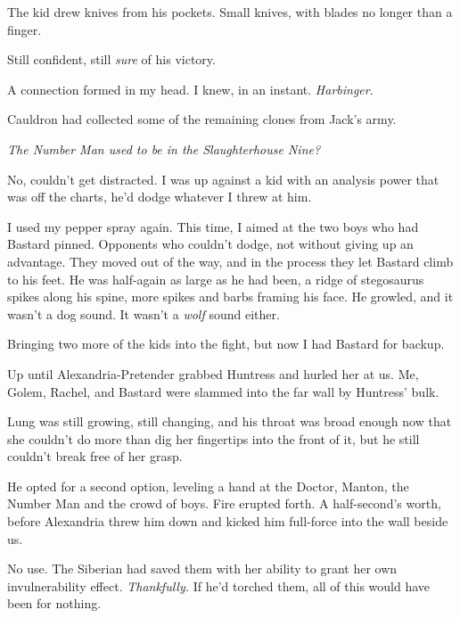 The kid drew knives from his pockets.  Small knives, with blades no longer than a finger.



Still confident, still \emph{sure} of his victory.



A connection formed in my head.  I knew, in an instant.  \emph{Harbinger}.



Cauldron had collected some of the remaining clones from Jack's army.



\emph{The Number Man used to be in the Slaughterhouse Nine?}



No, couldn't get distracted.  I was up against a kid with an analysis power that was off the charts, he'd dodge whatever I threw at him.



I used my pepper spray again.  This time, I aimed at the two boys who had Bastard pinned.  Opponents who couldn't dodge, not without giving up an advantage.  They moved out of the way, and in the process they let Bastard climb to his feet.  He was half-again as large as he had been, a ridge of stegosaurus spikes along his spine, more spikes and barbs framing his face.  He growled, and it wasn't a dog sound.  It wasn't a \emph{wolf} sound either.



Bringing two more of the kids into the fight, but now I had Bastard for backup.



Up until Alexandria-Pretender grabbed Huntress and hurled her at us.  Me, Golem, Rachel, and Bastard were slammed into the far wall by Huntress' bulk.



Lung was still growing, still changing, and his throat was broad enough now that she couldn't do more than dig her fingertips into the front of it, but he still couldn't break free of her grasp.



He opted for a second option, leveling a hand at the Doctor, Manton, the Number Man and the crowd of boys.  Fire erupted forth.  A half-second's worth, before Alexandria threw him down and kicked him full-force into the wall beside us.



No use.  The Siberian had saved them with her ability to grant her own invulnerability effect.  \emph{Thankfully.}  If he'd torched them, all of this would have been for nothing.



